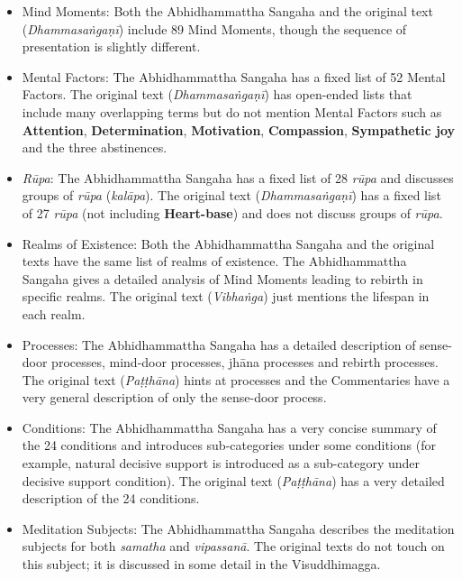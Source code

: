 \begin{itemize}

\item Mind Moments: Both the Abhidhammattha Sangaha and the original text (\textit{Dhammasaṅgaṇī}) include 89 Mind Moments, though the sequence of presentation is slightly different.

\item Mental Factors: The Abhidhammattha Sangaha has a fixed list of 52 Mental Factors. The original text (\textit{Dhammasaṅgaṇī}) has open-ended lists that include many overlapping terms but do not mention Mental Factors such as \textbf{Attention}, \textbf{Determination}, \textbf{Motivation}, \textbf{Compassion}, \textbf{Sympathetic joy} and the three abstinences.

\item \textit{Rūpa}: The Abhidhammattha Sangaha has a fixed list of 28 \textit{rūpa} and discusses groups of \textit{rūpa} (\textit{kalāpa}). The original text (\textit{Dhammasaṅgaṇī}) has a fixed list of 27 \textit{rūpa} (not including \textbf{Heart-base}) and does not discuss groups of \textit{rūpa}.

\item Realms of Existence: Both the Abhidhammattha Sangaha and the original texts have the same list of realms of existence. The Abhidhammattha Sangaha gives a detailed analysis of Mind Moments leading to rebirth in specific realms. The original text (\textit{Vibhaṅga}) just mentions the lifespan in each realm.

\item Processes: The Abhidhammattha Sangaha has a detailed description of sense-door processes, mind-door processes, jhāna processes and rebirth processes. The original text (\textit{Paṭṭhāna}) hints at processes and the Commentaries have a very general description of only the sense-door process.

\item Conditions: The Abhidhammattha Sangaha has a very concise summary of the 24 conditions and introduces sub-categories under some conditions (for example, natural decisive support is introduced as a sub-category under decisive support condition). The original text (\textit{Paṭṭhāna}) has a very detailed description of the 24 conditions.

\item Meditation Subjects: The Abhidhammattha Sangaha describes the meditation subjects for both \textit{samatha} and \textit{vipassanā}. The original texts do not touch on this subject; it is discussed in some detail in the Visuddhimagga.

\end{itemize}
